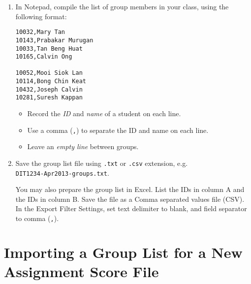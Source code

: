 \documentclass[a4paper,11pt]{refart}
\begin{document}
\begin{enumerate}
\item In Notepad, compile the list of group members in your class, using the following format:

\begin{lstlisting}
10032,Mary Tan
10143,Prabakar Murugan
10033,Tan Beng Huat
10165,Calvin Ong

10052,Mooi Siok Lan
10114,Bong Chin Keat
10432,Joseph Calvin
10281,Suresh Kappan
\end{lstlisting}

  \begin{itemize}[noitemsep]
  \item Record the \emph{ID} and \emph{name} of a student on each line.
  \item Use a comma (\texttt{,}) to separate the ID and name on each line.
  \item Leave an \emph{empty line} between groups.
  \end{itemize}

\item Save the group list file using \texttt{.txt} or \texttt{.csv} extension, e.g.\\\texttt{DIT1234-Apr2013-groups.txt}.

\medskip

\begin{leftbar}
You may also prepare the group list in Excel. List the IDs in column A and the IDs in column B. Save the file as a Comma separated values file (CSV). In the Export Filter Settings, set text delimiter to blank, and field separator to comma (\texttt{,}).
\end{leftbar}

\end{enumerate}

\section{Importing a Group List for a New Assignment Score File}
\end{document}
